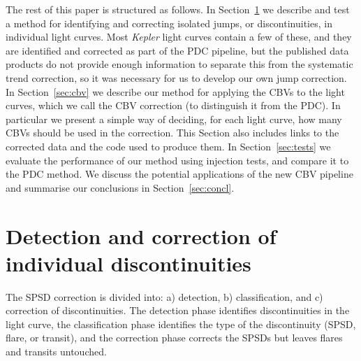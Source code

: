 \documentclass[useAMS,usenatbib]{mn2e}
\begin{document}
The rest of this paper is structured as follows. In Section~\ref{sec:jumps} we
describe and test a method for identifying and correcting isolated jumps, or 
discontinuities, in individual light curves. Most \emph{Kepler} light curves contain a few of these, and they are identified and corrected as part of
the PDC pipeline, but the published data products do not provide enough
information to separate this from the systematic trend correction, so
it was necessary for us to develop our own jump correction. In
Section~\ref{sec:cbv} we describe our method for applying the
CBVs to the light curves, which we call the CBV correction (to
distinguish it from the PDC). In particular we present a simple way of
deciding, for each light curve, how many CBVs should be used in the
correction. This Section also includes links to the corrected data and
the code used to produce them. In Section~\ref{sec:tests} we evaluate the performance of
our method using injection tests, and compare it to the PDC
method. We discuss the potential applications of the new CBV pipeline and summarise our conclusions in Section~\ref{sec:concl}.

\section{Detection and correction of individual discontinuities}
\label{sec:jumps}

The SPSD correction is divided into: a) detection, b) classification, and c) correction of discontinuities. The detection phase identifies discontinuities in the light curve, the classification phase identifies the type of the discontinuity (SPSD, flare, or transit), and the correction phase corrects the SPSDs but leaves flares and transits untouched.
\end{document}

